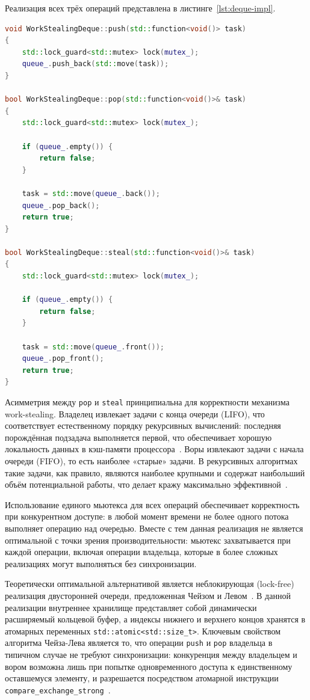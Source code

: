 Реализация всех трёх операций представлена
в листинге~\ref{lst:deque-impl}.

\begin{lstlisting}[language=C++,
                   caption={Реализация операций WorkStealingDeque},
                   label={lst:deque-impl}]
void WorkStealingDeque::push(std::function<void()> task)
{
    std::lock_guard<std::mutex> lock(mutex_);
    queue_.push_back(std::move(task));
}

bool WorkStealingDeque::pop(std::function<void()>& task)
{
    std::lock_guard<std::mutex> lock(mutex_);

    if (queue_.empty()) {
        return false;
    }

    task = std::move(queue_.back());
    queue_.pop_back();
    return true;
}

bool WorkStealingDeque::steal(std::function<void()>& task)
{
    std::lock_guard<std::mutex> lock(mutex_);

    if (queue_.empty()) {
        return false;
    }

    task = std::move(queue_.front());
    queue_.pop_front();
    return true;
}
\end{lstlisting}

Асимметрия между \texttt{pop} и \texttt{steal} принципиальна
для корректности механизма work-stealing. Владелец извлекает
задачи с конца очереди (LIFO), что соответствует естественному
порядку рекурсивных вычислений: последняя порождённая подзадача
выполняется первой, что обеспечивает хорошую локальность данных
в кэш-памяти процессора~\cite{Acar2000}. Воры извлекают задачи
с начала очереди (FIFO), то есть наиболее «старые» задачи.
В рекурсивных алгоритмах такие задачи, как правило, являются
наиболее крупными и содержат наибольший объём потенциальной
работы, что делает кражу максимально эффективной~\cite{Blumofe1999}.

Использование единого мьютекса для всех операций обеспечивает
корректность при конкурентном доступе: в любой момент времени
не более одного потока выполняет операцию над очередью.
Вместе с тем данная реализация не является оптимальной с точки
зрения производительности: мьютекс захватывается при каждой
операции, включая операции владельца, которые в более сложных
реализациях могут выполняться без синхронизации.

Теоретически оптимальной альтернативой является неблокирующая
(lock-free) реализация двусторонней очереди, предложенная
Чейзом и Левом~\cite{Chase2005}. В данной реализации внутреннее
хранилище представляет собой динамически расширяемый кольцевой
буфер, а индексы нижнего и верхнего концов хранятся в атомарных
переменных \texttt{std::atomic<std::size\_t>}. Ключевым свойством
алгоритма Чейза-Лева является то, что операции \texttt{push}
и \texttt{pop} владельца в типичном случае не требуют
синхронизации: конкуренция между владельцем и вором возможна
лишь при попытке одновременного доступа к единственному
оставшемуся элементу, и разрешается посредством атомарной
инструкции \texttt{compare\_exchange\_strong}~\cite{Chase2005}.


